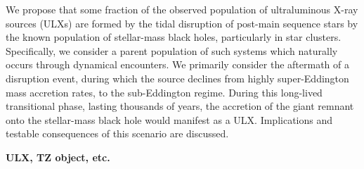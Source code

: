 
We propose that some fraction of the observed population of ultraluminous X-ray sources (ULXs) are formed by the tidal 
disruption of post-main sequence stars by the known population of stellar-mass black holes, particularly in star clusters.  Specifically, we consider a parent population of such systems which naturally occurs through dynamical encounters.  We primarily consider the aftermath of a disruption event, during which the source declines from highly super-Eddington mass accretion rates, to the sub-Eddington regime.  During this long-lived transitional phase, lasting thousands of years, the accretion of the giant remnant onto the stellar-mass black hole would manifest as a ULX.   Implications and testable consequences of this scenario are discussed.



{\bf ULX, TZ object, etc.}

